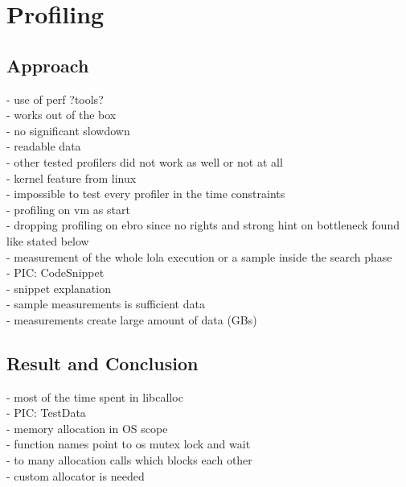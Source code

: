 \section{Profiling}
\subsection{Approach}
- use of perf ?tools?\\%
- works out of the box\\%
- no significant slowdown\\
- readable data\\
- other tested profilers did not work as well or not at all\\
- kernel feature from linux\\
- impossible to test every profiler in the time constraints\\
- profiling on vm as start\\%
- dropping profiling on ebro since no rights and strong hint on bottleneck found like stated below\\%
- measurement of the whole lola execution or a sample inside the search phase\\%
- PIC: CodeSnippet\\
- snippet explanation\\
- sample measurements is sufficient data\\ %
- measurements create large amount of data (GBs)\\

\subsection{Result and Conclusion}
- most of the time spent in libcalloc\\
- PIC: TestData\\
- memory allocation in OS scope\\
- function names point to os mutex lock and wait\\
- to many allocation calls which blocks each other\\
- custom allocator is needed\\

